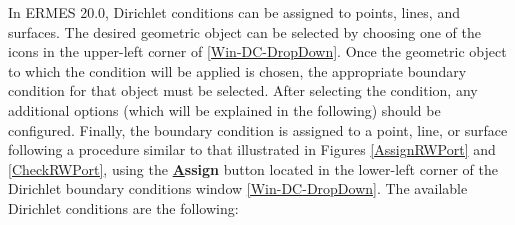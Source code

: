 \noindent In ERMES 20.0, Dirichlet conditions can be assigned to points, lines, and surfaces. The desired geometric object can be selected by choosing one of the icons in the upper-left corner of \ref{Win-DC-DropDown}. Once the geometric object to which the condition will be applied is chosen, the appropriate boundary condition for that object must be selected. After selecting the condition, any additional options (which will be explained in the following) should be configured. Finally, the boundary condition is assigned to a point, line, or surface following a procedure similar to that illustrated in Figures \ref{AssignRWPort} and \ref{CheckRWPort}, using the \textbf{\underline{A}ssign} button located in the lower-left corner of the Dirichlet boundary conditions window \ref{Win-DC-DropDown}. The available Dirichlet conditions are the following:

